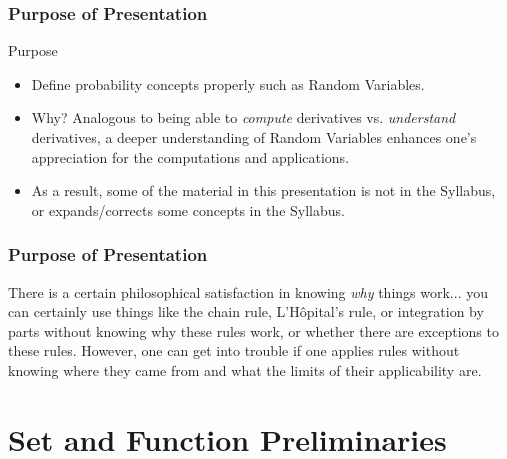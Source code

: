 \documentclass{beamer}
\begin{document}
\begin{frame}
\frametitle{Purpose of Presentation}
\begin{block}{Purpose}
  \begin{itemize}
    \item<2-> Define probability concepts properly such as Random Variables.
    \item<3-> Why? Analogous to being able to \emph{compute} derivatives vs. \emph{understand} derivatives, a deeper understanding of Random Variables enhances one's appreciation for the computations and applications.
    \item<4-> As a result, some of the material in this presentation is not in the Syllabus, or expands/corrects some concepts in the Syllabus.
  \end{itemize}
\end{block}
\end{frame}

\begin{frame}
\frametitle{Purpose of Presentation}
\begin{block}{\parencite[pp.~2-3]{analysis_tao}}
  There is a certain philosophical satisfaction in knowing \emph{why} things work... you can certainly use things like the chain rule, L'H\^{o}pital's rule, or integration by parts without knowing why these rules work, or whether there are exceptions to these rules. However, one can get into trouble if one applies rules without knowing where they came from and what the limits of their applicability are.
\end{block}
\end{frame}


\section{Set and Function Preliminaries}

\end{document}
